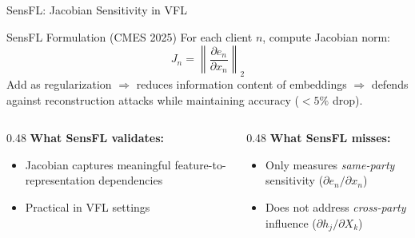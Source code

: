 \documentclass[aspectratio=169, 11pt]{beamer}
\begin{document}
\begin{frame}{SensFL: Jacobian Sensitivity in VFL}
  \begin{block}{SensFL Formulation (CMES 2025)}
    For each client $n$, compute Jacobian norm:
    \[
    J_n = \left\| \frac{\partial e_n}{\partial x_n} \right\|_2
    \]
    Add as regularization $\Rightarrow$ reduces information content of embeddings $\Rightarrow$ defends against reconstruction attacks while maintaining accuracy ($<5\%$ drop).
  \end{block}

  \vspace{0.3cm}
  \begin{columns}
    \begin{column}{0.48\textwidth}
      \textcolor{softgreen}{\textbf{What SensFL validates:}}
      \begin{itemize}
        \item Jacobian captures meaningful feature-to-representation dependencies
        \item Practical in VFL settings
      \end{itemize}
    \end{column}
    \begin{column}{0.48\textwidth}
      \textcolor{accentred}{\textbf{What SensFL misses:}}
      \begin{itemize}
        \item Only measures \emph{same-party} sensitivity ($\partial e_n / \partial x_n$)
        \item Does not address \emph{cross-party} influence ($\partial h_j / \partial X_k$)
      \end{itemize}
    \end{column}
  \end{columns}
\end{frame}
\end{document}
